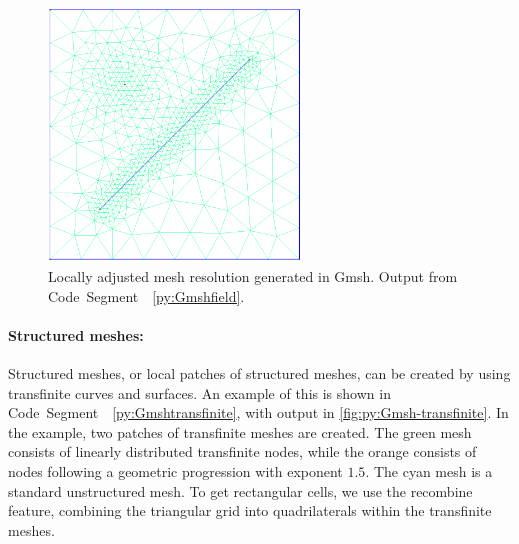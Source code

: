 \begin{figure}[htp]
    \centering
    \includegraphics[width=0.6\textwidth]{report/Images/Software/Gmsh examples/gmsh_mesh_size_fields.png}
    \caption[Adjusted mesh size generated in Gmsh]{Locally adjusted mesh resolution generated in Gmsh. Output from Code~Segment~~\ref{py:Gmshfield}.}
    \label{fig:py:Gmsh-field}
\end{figure}

\paragraph{Structured meshes:}
Structured meshes, or local patches of structured meshes, can be created by using transfinite curves and surfaces. An example of this is shown in Code~Segment~~\ref{py:Gmshtransfinite}, with output in \autoref{fig:py:Gmsh-transfinite}. In the example, two patches of transfinite meshes are created. The green mesh consists of linearly distributed transfinite nodes, while the orange consists of nodes following a geometric progression with exponent $1.5$. The cyan mesh is a standard unstructured mesh. To get rectangular cells, we use the recombine feature, combining the triangular grid into quadrilaterals within the transfinite meshes.

